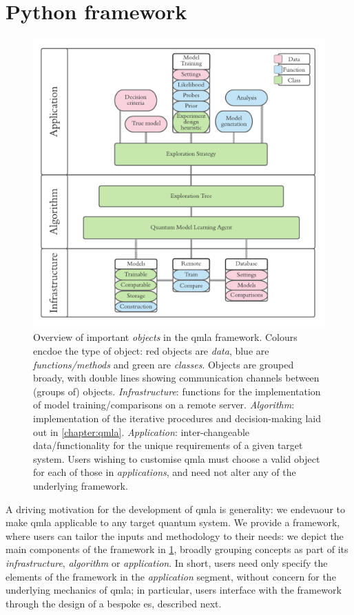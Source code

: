 \section{Python framework}
\begin{figure}
    \includegraphics{algorithms/figures/software_overview.pdf}
    \caption[ \gls{qmla} codebase overview]{
        Overview of important \emph{objects} in the \gls{qmla} framework.
        Colours encdoe the type of object: red objects are \emph{data}, blue are \emph{functions/methods} 
        and green are \emph{classes}. 
        Objects are grouped broady, with double lines showing communication channels between (groups of) objects. 
        \emph{Infrastructure}: functions for the implementation of model training/comparisons on 
        a remote server.
        \emph{Algorithm}: implementation of the iterative procedures and decision-making 
        laid out in \cref{chapter:qmla}. 
        \emph{Application}: inter-changeable data/functionality for the unique requirements 
        of a given target system. 
        Users wishing to customise \gls{qmla} must choose a valid object for each of those in \emph{applications}, 
            and need not alter any of the underlying framework.
    }
    \label{fig:software_overview}
\end{figure}

A driving motivation for the development of \gls{qmla} is generality:
    we endevaour to make \gls{qmla} applicable to any target quantum system.
We provide a framework, where users can tailor the inputs and methodology to their needs:
    we depict the main components of the framework in \cref{fig:software_overview}, 
    broadly grouping concepts as part of its \emph{infrastructure}, \emph{algorithm}
    or \emph{application}. 
In short, users need only specify the elements of the framework in the \emph{application} segment, 
    without concern for the underlying mechanics of \gls{qmla}; 
    in particular, users interface with the framework through the design of a bespoke \gls{es}, described next. 


